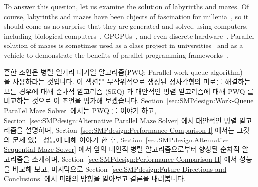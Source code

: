 To answer this question, let us examine the solution of
labyrinths and mazes.
Of course, labyrinths and mazes have been objects of fascination for
millenia~\cite{WikipediaLabyrinth},
so it should come as no surprise that they are generated and solved
using computers, including biological
computers~\cite{AndrewAdamatzky2011SlimeMold},
GPGPUs~\cite{ChristerEricson2008GPUMaze}, and even
discrete hardware~\cite{MIT:TRMag:MemristorMazes}.
Parallel solution of mazes is sometimes used as a class project in
universities~\cite{ETHZurich:FS2011maze,UMD:CMSC433maze} and
as a vehicle to demonstrate the benefits of parallel-programming
frameworks~\cite{RonFosner2010maze}.
\fi

흔한 조언은 병렬 일거리-대기열 알고리즘(PWQ: Parallel work-queue
algorithm)~\cite{ETHZurich:FS2011maze,RonFosner2010maze} 을 사용하라는
것입니다.
이 섹션은 무작위적으로 생성된 정사각형의 미로를 해결하는 모든 경우에 대해
순차적 알고리즘 (SEQ) 과 대안적인 병렬 알고리즘에 대해 PWQ 를 비교하는 것으로
이 조언을 평가해 보겠습니다.
Section~\ref{sec:SMPdesign:Work-Queue Parallel Maze Solver} 에서는 PWQ 를
이야기 하고,
Section~\ref{sec:SMPdesign:Alternative Parallel Maze Solver} 에서 대안적인 병렬
알고리즘을 설명하며,
Section~\ref{sec:SMPdesign:Performance Comparison I} 에서는 그것의 문제 있는
성능에 대해 이야기 한 후,
Section~\ref{sec:SMPdesign:Alternative Sequential Maze Solver} 에서 앞의 대안적
병렬 알고리즘으로부터 향상된 순차적 알고리즘을 소개하며,
Section~\ref{sec:SMPdesign:Performance Comparison II} 에서 성능을 비교해 보고,
마지막으로
Section~\ref{sec:SMPdesign:Future Directions and Conclusions} 에서 미래의
방향을 알아보고 결론을 내려봅니다.


